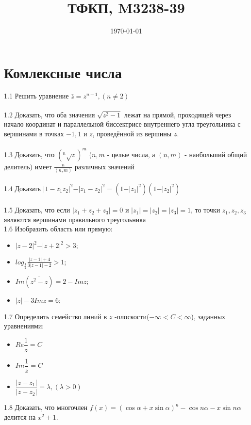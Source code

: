 \documentclass{article}
\title{ТФКП, M3238-39}
\date{\today}
\begin{document}
\maketitle

\section{Комлексные числа}
1.1 Решить уравнение $\bar{z} = z^{n-1}, (n \neq 2)$\\ \\
1.2 Доказать, что оба значения $\sqrt{z^2-1}$ лежат на прямой, проходящей через начало координат и параллельной биссектрисе внутреннего угла треугольника с вершинами в точках $-1, 1$ и $z$, проведённой из вершины $z$.\\ \\
1.3 Доказать, что $(^n\sqrt{z})^m$ ($n, m$ - целые числа, а $(n,m)$ - наибольший общий делитель) имеет $\frac{n}{(n, m)}$ различных значений \\ \\
1.4 Доказать $\vert 1 - \bar{z_1} z_2 \vert^2 - \vert z_1 - z_2 \vert ^2 = (1 - \vert z_1 \vert ^2) (1 - \vert z_2 \vert ^2)  $\\ \\
1.5 Доказать, что если $\vert z_1 + z_2 + z_3 \vert  = 0 $  и $\vert z_1 \vert = \vert z_2 \vert = \vert z_3 \vert= 1$, то точки $z_1, z_2, z_3$ являются вершинами правильного треугольника \\
1.6 Изобразить область или прямую: 
\begin{itemize}
    \item $\vert z-2 \vert^2 - \vert z+2 \vert^2 > 3$;
    \item $log_{\frac{1}{2}}\frac{\vert z - 1 \vert + 4}{3\vert z - 1\vert -2} > 1$;
    \item ${Im}(\overline{z^2-z})=2-{Im} z$;
    \item $\vert z \vert - 3{Im} z=6$;
\end{itemize}
   
1.7 Определить семейство линий в $z$ -плоскости($-\infty < C < \infty$), заданных уравнениями:
\begin{itemize}
	\item $Re \dfrac{1}{z}=C$
	\item $Im \dfrac{1}{z}=C$
	\item $\dfrac{\vert z - z_1 \vert}{\vert z - z_2 \vert}=\lambda, (\lambda > 0)$
\end{itemize}
    
1.8 Доказать, что многочлен $f(x) = (\cos \alpha + x \sin \alpha)^n - \cos n\alpha - x\sin n\alpha$ делится на $x^2+1$.
\end{document}
